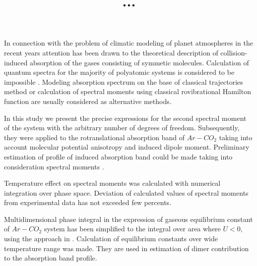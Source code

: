 \documentclass[12pt,a4paper]{article}
\title{...}
\date{}
\author{}
\begin{document}
\maketitle

In connection with the problem of climatic modeling of planet atmospheres \cite{vigasin2017} in the recent years attention has been drawn to the theoretical description of collision-induced absorption of the gases consisting of symmetic molecules. Calculation of quantum spectra for the majority of polyatomic systems is considered to be impossible \cite{frommhold}. Modeling absorption spectrum on the base of classical trajectories method or calculation of spectral moments using classical rovibrational Hamilton function are usually considered as alternative methods. \par 
In this study we present the precise expressions for the second spectral moment of the system with the arbitrary number of degrees of freedom. Subsequently, they were applied to the rotranslational absorption band of $Ar-CO_2$ taking into account molecular potential anisotropy and induced dipole moment. Preliminary estimation of profile of induced absorption band could be made taking into consideration spectral moments \cite{word2017}. \par
	Temperature effect on spectral moments was calculated with numerical integration over phase space. Deviation of calculated values of spectral moments from experimental data has not exceeded few percents. \par
	Multidimensional phase integral in the expression of gaseous equilibrium constant of $Ar-CO_2$ system has been simplified to the integral over area where $U < 0$, using the approach in \cite{vigasin2015}. Calculation of equilibrium constants over wide temperature range was made. They are used in estimation of dimer contribution to the absorption band profile.

\renewcommand{\refname}{References}


\end{document}
